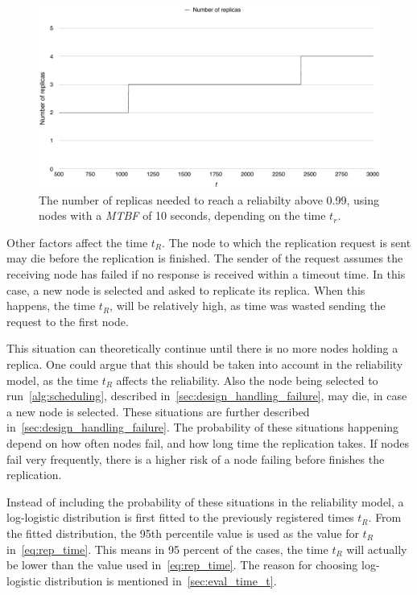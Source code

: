 \documentclass{cslthse-msc}
\begin{document}
\begin{figure}[!hbt]
\centering
\includegraphics[scale=0.5]{images/replicas_depending_on_t.pdf}
\caption[Number of replicas needed]{The number of replicas needed to reach a reliabilty above 0.99, using nodes with a \emph{MTBF} of 10 seconds, depending on the time $t_{r}$.}\label{fig:replicas_depending_on_t}
\end{figure}

Other factors affect the time $t_R$. The node to which the replication request is sent may die before the replication is finished. The sender of the request assumes the receiving node has failed if no response is received within a timeout time. In this case, a new node is selected and asked to replicate its replica. When this happens, the time $t_R$, will be relatively high, as time was wasted sending the request to the first node.

This situation can theoretically continue until there is no more nodes holding a replica. One could argue that this should be taken into account in the reliability model, as the time $t_R$ affects the reliability. Also the node being selected to run~\cref{alg:scheduling}, described in~\cref{sec:design_handling_failure}, may die, in case a new node is selected. These situations are further described in~\cref{sec:design_handling_failure}. The probability of these situations happening depend on how often nodes fail, and how long time the replication takes. If nodes fail very frequently, there is a higher risk of a node failing before finishes the replication.

Instead of including the probability of these situations in the reliability model, a log-logistic distribution is first fitted to the previously registered times $t_R$. From the fitted distribution, the 95th percentile value is used as the value for $t_R$ in~\cref{eq:rep_time}. This means in 95 percent of the cases, the time $t_R$ will actually be lower than the value used in~\cref{eq:rep_time}. The reason for choosing log-logistic distribution is mentioned in~\cref{sec:eval_time_t}.
\end{document}
